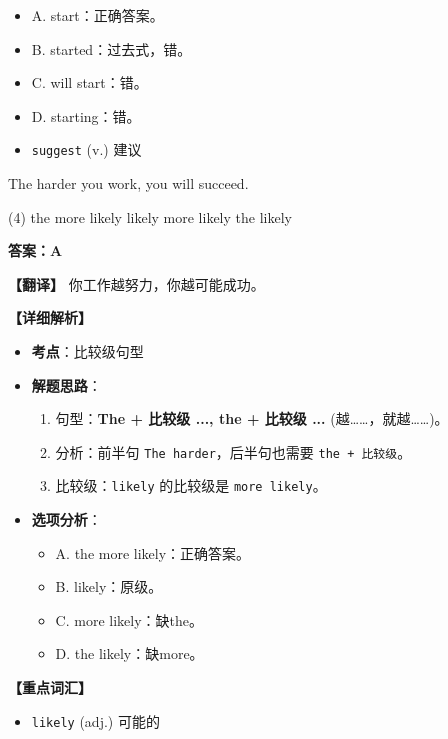\documentclass[11pt, a4paper]{article}
\newcommand{\analysis}[4]{
    \begin{solutionbox}
        \textbf{答案：#1}
        
        \textbf{【翻译】} #2
        
        \textbf{【详细解析】}
        #3
        
        \textbf{【重点词汇】}
        #4
    \end{solutionbox}
}
\newcommand{\blank}{\underline{\hspace{1.5cm}}}
\begin{document}
\begin{questions}
{\begin{itemize}
\begin{itemize}
                    \item A. start：正确答案。
                    \item B. started：过去式，错。
                    \item C. will start：错。
                    \item D. starting：错。
                \end{itemize}
        \end{itemize}
    }{
        \begin{itemize}
            \item \texttt{suggest} (v.) 建议
        \end{itemize}
    }

    \item The harder you work, \blank you will succeed.
    \begin{tasks}(4)
        \task the more likely \task likely \task more likely \task the likely
    \end{tasks}
    \analysis{A}{你工作越努力，你越可能成功。}{
        \begin{itemize}
            \item \textbf{考点}：比较级句型
            \item \textbf{解题思路}：
                \begin{enumerate}
                    \item 句型：\textbf{The + 比较级 ..., the + 比较级 ...} (越……，就越……)。
                    \item 分析：前半句 \texttt{The harder}，后半句也需要 \texttt{the + 比较级}。
                    \item 比较级：\texttt{likely} 的比较级是 \texttt{more likely}。
                \end{enumerate}
            \item \textbf{选项分析}：
                \begin{itemize}
                    \item A. the more likely：正确答案。
                    \item B. likely：原级。
                    \item C. more likely：缺the。
                    \item D. the likely：缺more。
                \end{itemize}
        \end{itemize}
    }{
        \begin{itemize}
            \item \texttt{likely} (adj.) 可能的

\end{itemize}}
\end{questions}
\end{document}
